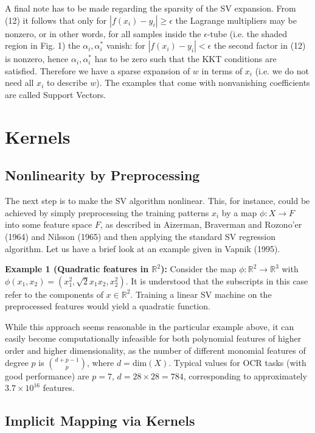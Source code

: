 \documentclass[fleqn,10pt]{olplainarticle}
\begin{document}
A final note has to be made regarding the sparsity of the SV expansion. From (12) it follows that only for \(|f(x_i) - y_i| \geq \epsilon\) the Lagrange multipliers may be nonzero, or in other words, for all samples inside the \(\epsilon\)-tube (i.e. the shaded region in Fig. 1) the \(\alpha_i, \alpha_i^*\) vanish: for \(|f(x_i) - y_i| < \epsilon\) the second factor in (12) is nonzero, hence \(\alpha_i, \alpha_i^*\) has to be zero such that the KKT conditions are satisfied. Therefore we have a sparse expansion of \(w\) in terms of \(x_i\) (i.e. we do not need all \(x_i\) to describe \(w\)). The examples that come with nonvanishing coefficients are called Support Vectors.

\section{Kernels}

\subsection{Nonlinearity by Preprocessing}

The next step is to make the SV algorithm nonlinear. This, for instance, could be achieved by simply preprocessing the training patterns \(x_i\) by a map \(\phi : X \rightarrow F\) into some feature space \(F\), as described in Aizerman, Braverman and Rozono'er (1964) and Nilsson (1965) and then applying the standard SV regression algorithm. Let us have a brief look at an example given in Vapnik (1995).

\textbf{Example 1 (Quadratic features in \(\mathbb{R}^2\)):} Consider the map \(\phi : \mathbb{R}^2 \rightarrow \mathbb{R}^3\) with \(\phi(x_1, x_2) = (x_1^2, \sqrt{2}x_1x_2, x_2^2)\). It is understood that the subscripts in this case refer to the components of \(x \in \mathbb{R}^2\). Training a linear SV machine on the preprocessed features would yield a quadratic function.

While this approach seems reasonable in the particular example above, it can easily become computationally infeasible for both polynomial features of higher order and higher dimensionality, as the number of different monomial features of degree \(p\) is \({d+p-1 \choose p}\), where \(d = \text{dim}(X)\). Typical values for OCR tasks (with good performance) are \(p = 7\), \(d = 28 \times 28 = 784\), corresponding to approximately \(3.7 \times 10^{16}\) features.

\subsection{Implicit Mapping via Kernels}
\end{document}
